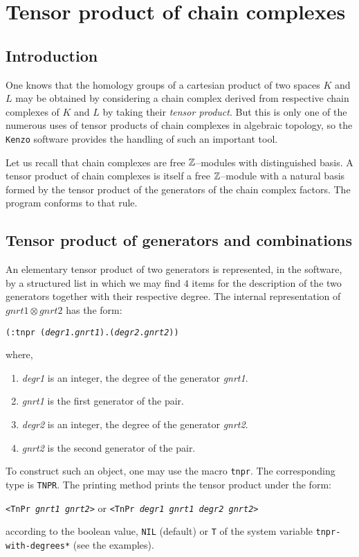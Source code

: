 \chapter{Tensor product of chain complexes}

\section{Introduction}

One knows that the homology groups of a cartesian product of two spaces
$K$ and $L$ may be obtained by considering a chain complex derived from 
respective chain complexes of $K$ and $L$ by taking their {\em tensor product}.
But this is only one of the numerous uses  of tensor products of chain complexes
in algebraic topology, so the {\tt Kenzo} software provides the handling of such
an important tool.
\par
Let us recall that chain complexes are free ${\Bbb Z}$--modules with distinguished basis.
A tensor product of chain complexes 
is itself a free ${\Bbb Z}$--module with a natural basis
formed by the tensor product of the generators of the chain complex factors.
The program conforms to that rule.

\section{Tensor product of generators and combinations}

An elementary tensor product 
of two generators is represented, in the software,
by a structured list in which we may find $4$ items for the description of the two generators 
together with their respective degree. The internal representation of $gnrt1 \otimes gnrt2$ has
the form:
\begin{center} 
{\tt (:tnpr ({\em degr1}.{\em gnrt1}).({\em degr2}.{\em gnrt2}))}
\end{center}
where,
\begin{enumerate}
\item {\em degr1} is an integer, the degree of the generator {\em gnrt1}.
\item {\em gnrt1} is the first generator of the pair.
\item {\em degr2} is an integer, the degree of the generator {\em gnrt2}.
\item {\em gnrt2} is  the second generator of the pair.
\end{enumerate}
To construct such an object, one may use the macro {\tt tnpr}. The cor\-res\-pon\-ding  type  is {\tt TNPR}.
The printing method prints the  tensor product under the form:
\begin{center}
{\tt <TnPr {\em gnrt1 gnrt2}>} or {\tt <TnPr {\em degr1 gnrt1 degr2 gnrt2}>}
\end{center}
according to the boolean value, {\tt NIL} (default) or {\tt T}  of the system variable 
{\tt *tnpr-with-degrees*} (see the examples).

